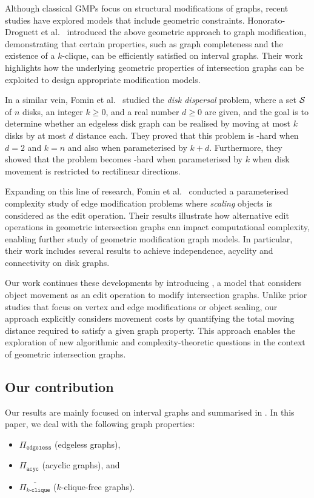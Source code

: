 Although classical GMPs focus on structural modifications of graphs, recent studies have explored models that include geometric constraints. Honorato-Droguett et al.~\cite{HonoratoDroguett2024} introduced the above geometric approach to graph modification, demonstrating that certain properties, such as graph completeness and the existence of a $k$-clique, can be efficiently satisfied on interval graphs. 
Their work highlights how the underlying geometric properties of intersection graphs can be exploited to design appropriate modification models.

In a similar vein, Fomin et al.~\cite{fomin2023} studied the \emph{disk dispersal} problem, where a set $\S$ of $n$ disks, an integer $k \geq 0$, and a real number $d \geq 0$ are given, and the goal is to determine whether an edgeless disk graph can be realised by moving at most $k$ disks by at most $d$ distance each. They proved that this problem is {\NP-hard} when $d=2$ and $k = n$ and also {\FPT} when parameterised by $k+d$. Furthermore, they showed that the problem becomes \W[1]-hard when parameterised by $k$ when disk movement is restricted to rectilinear directions.

Expanding on this line of research, Fomin et al.~\cite{Fomin2025} conducted a parameterised complexity study of edge modification problems where \emph{scaling} objects is considered as the edit operation. Their results illustrate how alternative edit operations in geometric intersection graphs can impact computational complexity, enabling further study of geometric modification graph models.
In particular, their work includes several {\FPT} results to achieve independence, acyclity and connectivity on disk graphs.

Our work continues these developments by introducing {\gged}, a model that considers object movement as an edit operation to modify intersection graphs. Unlike prior studies that focus on vertex and edge modifications or object scaling, our approach explicitly considers movement costs by quantifying the total moving distance required to satisfy a given graph property. This approach enables the exploration of new algorithmic and complexity-theoretic questions in the context of geometric intersection graphs.

\subsection*{Our contribution}
Our results are mainly focused on interval graphs and summarised in . In this paper, we deal with the following graph properties: \begin{itemize} 
\item $\Pi_{\texttt{edgeless}}$ (edgeless graphs), 
\item $\Pi_{\texttt{acyc}}$ (acyclic graphs), and 
\item $\overline{\Pi_{k\texttt{-clique}}}$ ($k$-clique-free graphs).
\end{itemize} 

